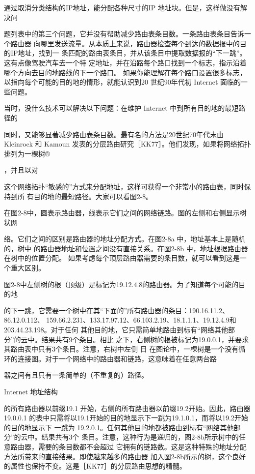 通过取消分类结构的IP地址，能分配各种尺寸的IP 地址块。但是，这样做没有解决问

题列表中的第三个问题，它并没有帮助减少路由表条目数。一条路由表条目告诉一个路由器
向哪里发送流量。从本质上来说，路由器检查每个到达的数据报中的目的IP地址，找到一
条匹配的路由表条目，并从该条目中提取数据报的“下一跳”。这有点像驾驶汽车去一个特
定地址，并在沿路每个路口找到一个标志，指示沿着哪个方向去目的地路线的下一个路口。
如果你能理解在每个路口设置很多标志，以指向每个可能的目的地的情形，就能认识到20
世纪90年代初 Internet 面临的一些问题。

当时，没什么技术可以解决以下问题：在维护 Internet 中到所有目的地的最短路径的

同时，又能够显著减少路由表条目数。最有名的方法是20世纪70年代末由 Kleinrock 和
Kamoun 发表的分层路由研究［KK77］。他们发现，如果将网络拓扑排列为一棵树®

，并且以对

这个网络拓扑“敏感的”方式来分配地址，这样可获得一个非常小的路由表，同时保持到所
有目的地的最短路径。大家可以看图2-8。

在图2-8中，圆表示路由器，线表示它们之间的网络链路。图的左侧和右侧显示树状网

络。它们之间的区别是路由器的地址分配方式。在图2-8a 中，地址基本上是随机的，树中
的路由器地址和位置之间没有直接关系。在图2-8b 中，地址根据路由器在树中的位置分配。
如果考虑每个顶层路由器需要的条目数，就可以看到这是一个重大区别。

图2-8中左侧树的根（顶级）是标记为19.12.4.8的路由器。为了知道每个可能的目的地

的下一跳，它需要一个树中在其“下面的”所有路由器的条目：190.16.11.2、86.12.0.112、
159.66.2.231、133.17.97.12、66.103.2.19、18.1.1.1、19.12.4.9和 203.44.23.198。对于任何
其他目的地，它只需简单地路由到标有“网络其他部分”的云中。结果共有9个条目。相比
之下，右侧树的根被标记为19.0.0.1，并要求其路由表中只有3个条目。注意，右树中左侧
日 在图论中，一棵树是一个没有循环的连接图。对于一个网络中的路由器和链路，这意味着在任意两台路

器之间有且只有一条简单的（不重复的）路径。

Internet 地址结构

的所有路由器以前缀19.1 开始，右侧的所有路由器以前缀19.2开始。因此，路由器 19.0.0.1
的表中只需将以19.1开始的目的地显示下一跳为19.1.0.1，而将以19.2开始的目的地显示下
一跳为 19.2.0.1。任何其他目的地都被路由到标有“网络其他部分”的云中。结果共有3个
条目。注意，这种行为是递归的，图2-8b所示树中的任意路由器，需要的条目数都不会超过
它拥有的链路数。这是这种特殊的地址分配方法所带来的直接结果。即使越来越多的路由器
加入图2-8b所示的树，这个良好的属性也保持不变。这是［KK77］的分层路由思想的精髓。

